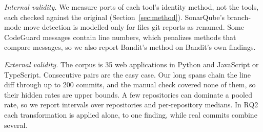 \textit{Internal validity.} We measure ports of each tool's identity method, not the tools, each checked against the original (Section~\ref{sec:method}). SonarQube's branch-mode move detection is modelled only for files git reports as renamed. Some CodeGuard messages contain line numbers, which penalizes methods that compare messages, so we also report Bandit's method on Bandit's own findings.

\textit{External validity.} The corpus is 35 web applications in Python and JavaScript or TypeScript. Consecutive pairs are the easy case. Our long spans chain the line diff through up to 200 commits, and the manual check covered none of them, so their hidden rates are upper bounds. A few repositories can dominate a pooled rate, so we report intervals over repositories and per-repository medians. In RQ2 each transformation is applied alone, to one finding, while real commits combine several.
